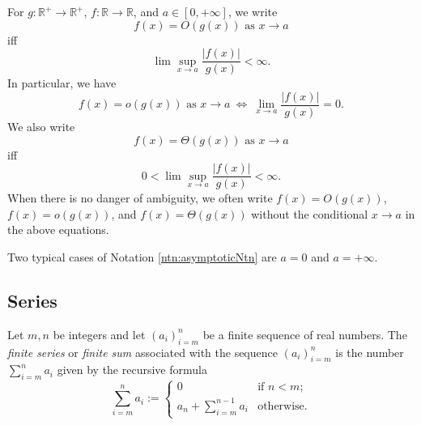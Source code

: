 \begin{ntn}
  \label{ntn:asymptoticNtn}
  For $g:\mathbb{R}^+\rightarrow\mathbb{R}^+$, 
  $f:\mathbb{R} \rightarrow\mathbb{R}$, 
  and $a\in [0,+\infty]$, 
  we write
  \begin{displaymath}
    f(x) = O(g(x)) \text{ as } x\to a %
  \end{displaymath}
  iff %
  \begin{displaymath}
    \lim\sup_{x\rightarrow a} \frac{|f(x)|}{g(x)} < \infty.
  \end{displaymath}
  In particular, we have
  \begin{displaymath}
    f(x) = o(g(x)) \text{ as } x\to a
    \ \Leftrightarrow\
    \lim_{x\rightarrow a} \frac{|f(x)|}{g(x)} = 0.
  \end{displaymath}
  We also write
  \begin{displaymath}
    f(x)=\Theta(g(x)) \text{ as } x\to a %
  \end{displaymath}
  iff
  \begin{displaymath}
    0< \lim\sup_{x\rightarrow a} \frac{|f(x)|}{g(x)} < \infty.
  \end{displaymath}
  When there is no danger of ambiguity,
  we often write $f(x)=O(g(x))$,
  $f(x)=o(g(x))$, and $f(x)=\Theta(g(x))$
  without the conditional $x \rightarrow a$
  in the above equations.
\end{ntn}

\begin{rem}
  Two typical cases of Notation \ref{ntn:asymptoticNtn}
  are $a=0$ and $a=+\infty$.
\end{rem}


\subsection{Series}
\label{sec:series}

\begin{defn}
  Let $m,n$ be integers
  and let $(a_i)_{i=m}^n$ be a finite sequence of real numbers.
  The \emph{finite series} or \emph{finite sum} associated with the sequence
  $(a_i)_{i=m}^n$ is the number $\sum_{i=m}^n a_i$
  given by the recursive formula
  \begin{equation}
    \label{eq:finiteSeries}
    \sum_{i=m}^n a_i :=
    \begin{cases}
      0 & \text{if } n< m;
      \\
      a_n + \sum_{i=m}^{n-1} a_i & \text{otherwise}.
    \end{cases}
  \end{equation}
\end{defn}

